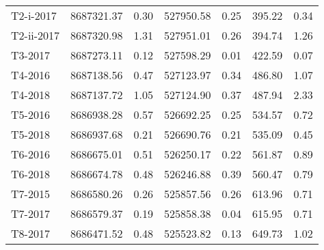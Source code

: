 \begin{tabular}{lrrrrrr}
   T2-i-2017 &    8687321.37 &                0.30 &    527950.58 &               0.25 &         395.22 &                 0.34 \\
  T2-ii-2017 &    8687320.98 &                1.31 &    527951.01 &               0.26 &         394.74 &                 1.26 \\
     T3-2017 &    8687273.11 &                0.12 &    527598.29 &               0.01 &         422.59 &                 0.07 \\
     T4-2016 &    8687138.56 &                0.47 &    527123.97 &               0.34 &         486.80 &                 1.07 \\
     T4-2018 &    8687137.72 &                1.05 &    527124.90 &               0.37 &         487.94 &                 2.33 \\
     T5-2016 &    8686938.28 &                0.57 &    526692.25 &               0.25 &         534.57 &                 0.72 \\
     T5-2018 &    8686937.68 &                0.21 &    526690.76 &               0.21 &         535.09 &                 0.45 \\
     T6-2016 &    8686675.01 &                0.51 &    526250.17 &               0.22 &         561.87 &                 0.89 \\
     T6-2018 &    8686674.78 &                0.48 &    526246.88 &               0.39 &         560.47 &                 0.79 \\
     T7-2015 &    8686580.26 &                0.26 &    525857.56 &               0.26 &         613.96 &                 0.71 \\
     T7-2017 &    8686579.37 &                0.19 &    525858.38 &               0.04 &         615.95 &                 0.71 \\
     T8-2017 &    8686471.52 &                0.48 &    525523.82 &               0.13 &         649.73 &                 1.02 \\
\bottomrule
\end{tabular}
